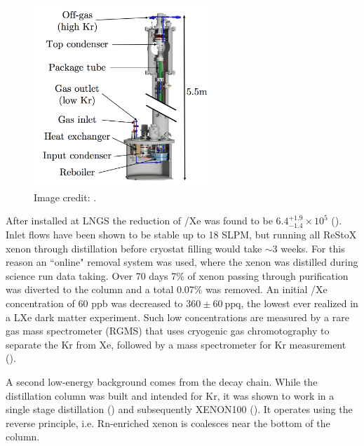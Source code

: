 \begin{figure}
\centering
\includegraphics[width=0.6\textwidth]{KrColumn}
\caption{Image credit: .}
\label{fig:xeno1t_kr_dist_column}
\end{figure}

After installed at LNGS the reduction of /Xe was found to be $6.4_{-1.4}^{+1.9} \times 10^{5}$
().  Inlet flows have been shown to be stable up to 18 SLPM, but running all ReStoX xenon through distillation before
cryostat filling would take ${\sim}3$ weeks.  For this reason an ``online" removal system was used, where the xenon was distilled during
science run data taking.  Over 70 days 7\% of xenon passing through purification was diverted to the column and a total 0.07\% was
removed.  An initial /Xe concentration of 60 ppb was decreased to $360 \pm 60\ \mathrm{ppq}$, the lowest ever realized in a
LXe dark matter experiment.  Such low concentrations are measured by a rare gas mass spectrometer (RGMS) that uses cryogenic gas
chromotography to separate the Kr from Xe, followed by a mass spectrometer for Kr measurement ().

A second low-energy background comes from the  decay chain.  While the distillation column was built and intended for Kr,
it was shown to work in a single stage distillation () and subsequently XENON100
().  It operates using the reverse principle, i.e. Rn-enriched xenon is coalesces near the bottom of the column.



